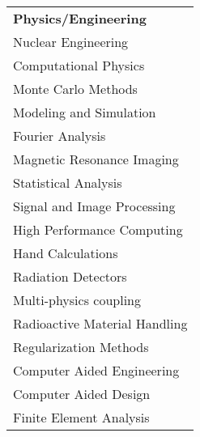 
\begin{minipage}{0.32\textwidth}
\begin{tabular}{l}
	{\large\textbf{Physics/Engineering}} \\
	\highskillbw Nuclear Engineering \\
	\highskillbw Computational Physics \\
	\highskillbw Monte Carlo Methods \\
	\highskillbw Modeling and Simulation \\
	\highskillbw Fourier Analysis \\ 
	\highskillbw Magnetic Resonance Imaging \\ 
	\medskillbw Statistical Analysis \\
	\medskillbw Signal and Image Processing \\
	\medskillbw High Performance Computing \\
	\medskillbw Hand Calculations \\
	\medskillbw Radiation Detectors \\
	\medskillbw Multi-physics coupling \\
	\medskillbw Radioactive Material Handling \\
	\medskillbw Regularization Methods  \\
	\lowskillbw Computer Aided Engineering \\
	\lowskillbw Computer Aided Design \\
	\lowskillbw Finite Element Analysis \\
\end{tabular}
\end{minipage}%
